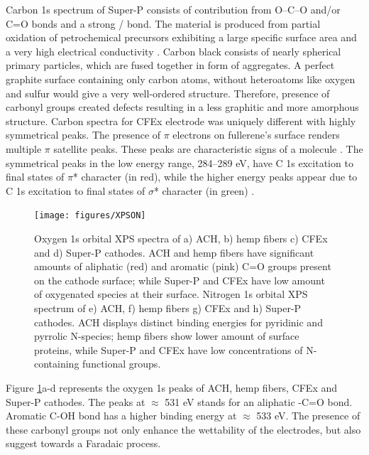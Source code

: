 Carbon 1s spectrum of Super-P consists of contribution from O–C–O and/or C=O bonds and a strong / bond. The material is produced from partial oxidation of petrochemical precursors exhibiting a large specific surface area and a very high electrical conductivity \cite{gnanamuthu_electrochemical_2011}. Carbon black consists of nearly spherical primary particles, which are fused together in form of aggregates. A perfect graphite surface containing only carbon atoms, without heteroatoms like oxygen and sulfur would give a very well-ordered structure. Therefore, presence of carbonyl groups created defects resulting in a less graphitic and more amorphous structure\cite{hao_carbonaceous_2013}. 
Carbon spectra for CFEx electrode was uniquely different with highly symmetrical peaks. The presence of $\pi$ electrons on fullerene's surface renders multiple $\pi$ satellite peaks. These peaks are characteristic signs of a  molecule \cite{skryleva_xps_2016}. The symmetrical peaks in the low energy range, 284–289 eV, have C 1s excitation to final states of $\pi$* character (in red), while the higher energy peaks appear due to C 1s excitation to final states of $\sigma$* character (in green) \cite{erbahar_spectromicroscopy_2016, poirier_carbon_1993}. %
\begin{figure}[tbh!]
  \centering
  \texttt{[image: figures/XPSON]}
    \caption{Oxygen 1s orbital XPS spectra of a) ACH, b) hemp fibers c) CFEx and d) Super-P cathodes. ACH and hemp fibers have significant amounts of aliphatic (red) and aromatic (pink) C=O groups present on the cathode surface; while Super-P and CFEx have low amount of oxygenated species at their surface. Nitrogen 1s orbital XPS spectrum of e) ACH, f) hemp fibers g) CFEx and h) Super-P cathodes. ACH displays distinct binding energies for pyridinic and pyrrolic N-species; hemp fibers show lower amount of surface proteins, while Super-P and CFEx have low concentrations of N-containing functional groups.}
  \label{figures:XPSON}
\end{figure}
Figure \ref{figures:XPSON}a-d represents the oxygen 1s peaks of ACH, hemp fibers, CFEx and Super-P cathodes. The peaks at $\approx$ 531 eV stands for an aliphatic -C=O bond. Aromatic C-OH bond has a higher binding energy at $\approx$ 533 eV. The presence of these carbonyl groups not only enhance the wettability of the electrodes, but also suggest towards a Faradaic process\cite{taberna_electrode_2006}. 
